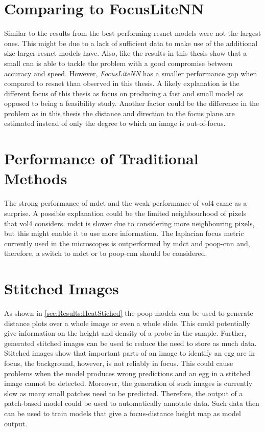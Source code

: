 \section{Comparing to FocusLiteNN}
\label{ch:Discussion:FocusLiteNN}

Similar to the results from \textcite{wang2020focuslitenn} the best performing \ac{resnet} models were not the largest ones. This might be due to a lack of sufficient data to make use of the additional size larger \ac{resnet} models have. Also, like \citeauthor{wang2020focuslitenn} the results in this thesis show that a small \ac{cnn} is able to tackle the problem with a good compromise between accuracy and speed. However, \textit{FocusLiteNN} has a smaller performance gap when compared to \ac{resnet} than observed in this thesis. A likely explanation is the different focus of this thesis as \citeauthor{wang2020focuslitenn} focus on producing a fast and small model as opposed to being a feasibility study. Another factor could be the difference in the problem as in this thesis the distance and direction to the focus plane are estimated instead of only the degree to which an image is out-of-focus.

\section{Performance of Traditional Methods}
\label{ch:Discussion:PerformanceTraditional}

The strong performance of \ac{mdct} and the weak performance of \ac{vol4} came as a surprise. A possible explanation could be the limited neighbourhood of pixels that \ac{vol4} considers. \Ac{mdct} is slower due to considering more neighbouring pixels, but this might enable it to use more information. The \Ac{laplacian} focus metric currently used in the microscopes is outperformed by \ac{mdct} and \ac{poop}-\ac{cnn} and, therefore, a switch to \ac{mdct} or to \ac{poop}-\ac{cnn} should be considered.

\section{Stitched Images}
\label{ch:Discussion:StitchedImages}

As shown in \autoref{sec:Results:HeatStiched} the \ac{poop} models can be used to generate distance plots over a whole image or even a whole slide. This could potentially give information on the height and density of a probe in the sample. Further, generated stitched images can be used to reduce the need to store as much data. Stitched images show that important parts of an image to identify an egg are in focus, the background, however, is not reliably in focus. This could cause problems when the model produces wrong predictions and an egg in a stitched image cannot be detected. Moreover, the generation of such images is currently slow as many small patches need to be predicted. Therefore, the output of a patch-based model could be used to automatically annotate data. Such data then can be used to train models that give a focus-distance height map as model output.

